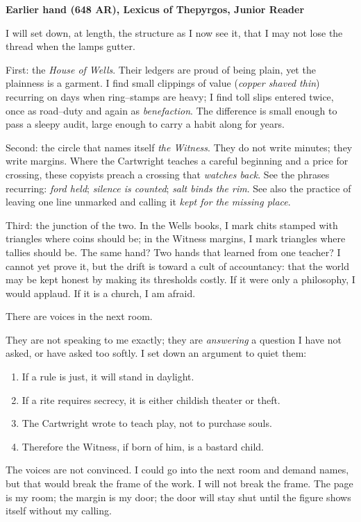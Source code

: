 \documentclass[11pt]{article}
\numberwithin{equation}{section} %
\theoremstyle{plain} %
\theoremstyle{definition} %
\theoremstyle{remark} %
\begin{document}
\medskip
\noindent\textbf{Earlier hand (648 AR), Lexicus of Thepyrgos, Junior Reader}

I will set down, at length, the structure as I now see it, that I may not lose the thread when the lamps gutter.

First: the \textit{House of Wells}. Their ledgers are proud of being plain, yet the plainness is a garment. I find small clippings of value (\emph{copper shaved thin}) recurring on days when ring--stamps are heavy; I find toll slips entered twice, once as road--duty and again as \emph{benefaction}. The difference is small enough to pass a sleepy audit, large enough to carry a habit along for years.

Second: the circle that names itself \textit{the Witness}. They do not write minutes; they write margins. Where the Cartwright teaches a careful beginning and a price for crossing, these copyists preach a crossing that \emph{watches back}. See the phrases recurring: \emph{ford held}; \emph{silence is counted}; \emph{salt binds the rim}. See also the practice of leaving one line unmarked and calling it \emph{kept for the missing place}.

Third: the junction of the two. In the Wells books, I mark chits stamped with triangles where coins should be; in the Witness margins, I mark triangles where tallies should be. The same hand? Two hands that learned from one teacher? I cannot yet prove it, but the drift is toward a cult of accountancy: that the world may be kept honest by making its thresholds costly. If it were only a philosophy, I would applaud. If it is a church, I am afraid.

There are voices in the next room.

They are not speaking to me exactly; they are \emph{answering} a question I have not asked, or have asked too softly. I set down an argument to quiet them:

\begin{enumerate}\setlength\itemsep{0.25em}
  \item If a rule is just, it will stand in daylight.
  \item If a rite requires secrecy, it is either childish theater or theft.
  \item The Cartwright wrote to teach play, not to purchase souls.
  \item Therefore the Witness, if born of him, is a bastard child.
\end{enumerate}

The voices are not convinced. I could go into the next room and demand names, but that would break the frame of the work. I will not break the frame. The page is my room; the margin is my door; the door will stay shut until the figure shows itself without my calling.
\end{document}

